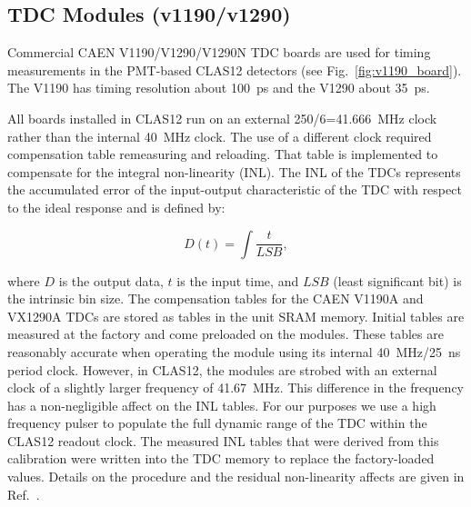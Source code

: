 \subsection{TDC Modules (v1190/v1290)}

Commercial CAEN V1190/V1290/V1290N TDC \cite{tdc-ref} boards are used for timing measurements in the PMT-based CLAS12 detectors (see Fig.~\ref{fig:v1190_board}). The V1190 has timing resolution about 100~ps and the V1290 about 35~ps.

All boards installed in CLAS12 run on an external 250/6=41.666~MHz clock rather than the internal 40~MHz clock. The use of a different clock required compensation table remeasuring and reloading. That table is implemented to compensate for the  integral non-linearity (INL). The INL of the TDCs represents the accumulated error of the input-output characteristic of the TDC with respect to the ideal response and is defined by:

\begin{equation}
D(t) = \int \frac{t}{LSB},
\end{equation}

\noindent
where $D$ is the output data, $t$ is the input time, and $LSB$ (least significant bit) is the intrinsic bin
size. The compensation tables for the CAEN V1190A and VX1290A TDCs are stored as tables in the unit
SRAM memory. Initial tables are measured at the factory and come preloaded on the modules. These
tables are reasonably accurate when operating the module using its internal 40~MHz/25~ns period clock.
However, in CLAS12, the modules are strobed with an external clock of a slightly larger frequency of
41.67~MHz. This difference in the frequency has a non-negligible affect on the INL tables. For our
purposes we use a high frequency pulser to populate the full dynamic range of the TDC within the CLAS12
readout clock. The measured INL tables that were derived from this calibration were written into the
TDC memory to replace the factory-loaded values. Details on the procedure and the residual non-linearity
affects are given in Ref.~\cite{inl-tables}.

